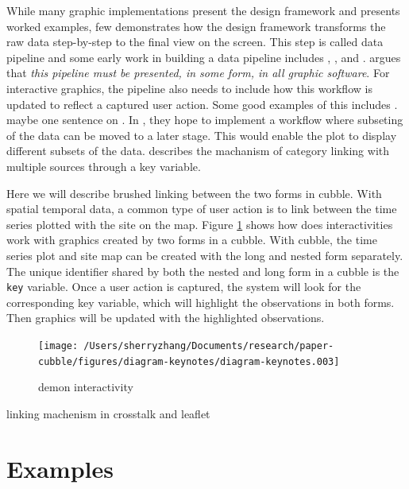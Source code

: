 \documentclass[
]{jss}
\begin{document}
While many graphic implementations present the design framework and
presents worked examples, few demonstrates how the design framework
transforms the raw data step-by-step to the final view on the screen.
This step is called data pipeline and some early work in building a data
pipeline includes \citet{buja1988elements}, \citet{buja1996interactive},
and \citet{sutherland2000orca}. \citet{wickham2009plumbing} argues that
\emph{this pipeline must be presented, in some form, in all graphic
software}. For interactive graphics, the pipeline also needs to include
how this workflow is updated to reflect a captured user action. Some
good examples of this includes \citep{xie2014reactive}. maybe one
sentence on \citet{cheng2016enabling}. In \citet{wickham2009plumbing},
they hope to implement a workflow where subseting of the data can be
moved to a later stage. This would enable the plot to display different
subsets of the data. \citet{xie2014reactive} describes the machanism of
category linking with multiple sources through a key variable.

Here we will describe brushed linking between the two forms in cubble.
With spatial temporal data, a common type of user action is to link
between the time series plotted with the site on the map. Figure
\ref{fig:interactive-workflow} shows how does interactivities work with
graphics created by two forms in a cubble. With cubble, the time series
plot and site map can be created with the long and nested form
separately. The unique identifier shared by both the nested and long
form in a cubble is the \texttt{key} variable. Once a user action is
captured, the system will look for the corresponding key variable, which
will highlight the observations in both forms. Then graphics will be
updated with the highlighted observations.

\begin{CodeChunk}
\begin{figure}

{\centering \texttt{[image: /Users/sherryzhang/Documents/research/paper-cubble/figures/diagram-keynotes/diagram-keynotes.003]} 

}

\caption[demon interactivity]{demon interactivity}\label{fig:interactive-workflow}
\end{figure}
\end{CodeChunk}

linking machenism in crosstalk and leaflet

\newpage

\hypertarget{examples}{%
\section{Examples}\label{examples}}
\end{document}
